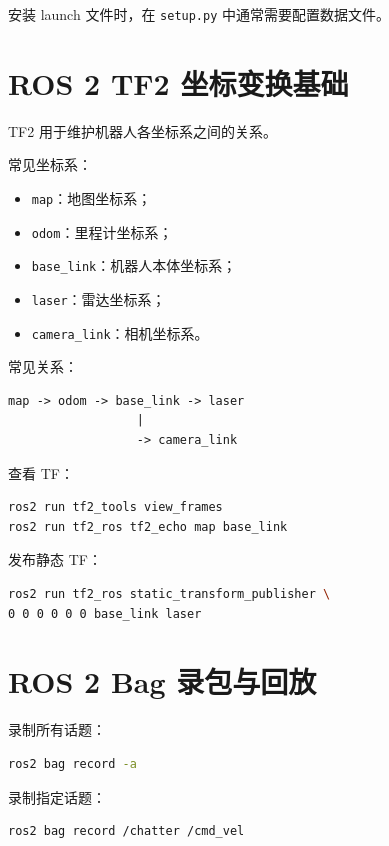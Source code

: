 \documentclass[UTF8,a4paper,12pt]{ctexart}
\begin{document}
安装 launch 文件时，在 \texttt{setup.py} 中通常需要配置数据文件。

\section{ROS 2 TF2 坐标变换基础}

TF2 用于维护机器人各坐标系之间的关系。

常见坐标系：
\begin{itemize}
    \item \texttt{map}：地图坐标系；
    \item \texttt{odom}：里程计坐标系；
    \item \texttt{base\_link}：机器人本体坐标系；
    \item \texttt{laser}：雷达坐标系；
    \item \texttt{camera\_link}：相机坐标系。
\end{itemize}

常见关系：

\begin{lstlisting}
map -> odom -> base_link -> laser
                  |
                  -> camera_link
\end{lstlisting}

查看 TF：

\begin{lstlisting}[language=bash]
ros2 run tf2_tools view_frames
ros2 run tf2_ros tf2_echo map base_link
\end{lstlisting}

发布静态 TF：

\begin{lstlisting}[language=bash]
ros2 run tf2_ros static_transform_publisher \
0 0 0 0 0 0 base_link laser
\end{lstlisting}

\section{ROS 2 Bag 录包与回放}

录制所有话题：

\begin{lstlisting}[language=bash]
ros2 bag record -a
\end{lstlisting}

录制指定话题：

\begin{lstlisting}[language=bash]
ros2 bag record /chatter /cmd_vel
\end{lstlisting}
\end{document}
